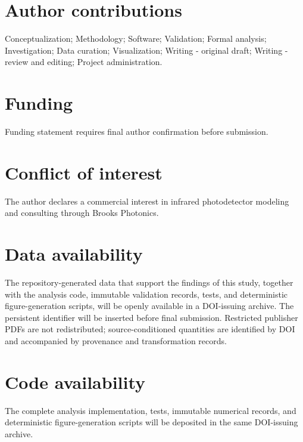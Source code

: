 \documentclass[12pt]{article}
\begin{document}
\section*{Author contributions}
Conceptualization; Methodology; Software; Validation; Formal analysis; Investigation; Data curation; Visualization; Writing - original draft; Writing - review and editing; Project administration.
\section*{Funding}
Funding statement requires final author confirmation before submission.
\section*{Conflict of interest}
The author declares a commercial interest in infrared photodetector modeling and consulting through Brooks Photonics.
\section*{Data availability}
The repository-generated data that support the findings of this study, together with the analysis code, immutable validation records, tests, and deterministic figure-generation scripts, will be openly available in a DOI-issuing archive. The persistent identifier will be inserted before final submission. Restricted publisher PDFs are not redistributed; source-conditioned quantities are identified by DOI and accompanied by provenance and transformation records.
\section*{Code availability}
The complete analysis implementation, tests, immutable numerical records, and deterministic figure-generation scripts will be deposited in the same DOI-issuing archive.
\end{document}
